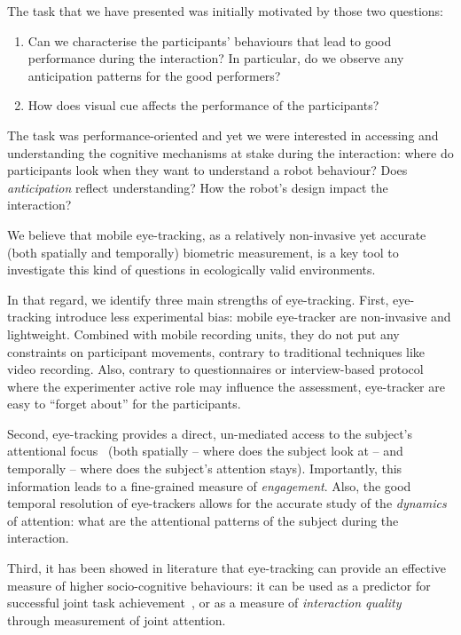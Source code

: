 \documentclass{sig-alternate}
\begin{document}
The task that we have presented was initially motivated by those two questions:

\begin{enumerate}
    \item Can we characterise the participants' behaviours that
        lead to good performance during the interaction? In particular, do
        we observe any anticipation patterns for the good performers?

    \item How does visual cue affects the performance of the participants?

\end{enumerate}

The task was performance-oriented and yet we were interested in accessing and
understanding the cognitive mechanisms at stake during the interaction: where do
participants look when they want to understand a robot behaviour? Does
\emph{anticipation} reflect understanding? How the robot's design impact the
interaction?

We believe that mobile eye-tracking, as a relatively non-invasive yet accurate
(both spatially and temporally) biometric measurement, is a key tool to
investigate this kind of questions in ecologically valid environments.

In that regard, we identify three main strengths of eye-tracking. First,
eye-tracking introduce less experimental bias: mobile eye-tracker are
non-invasive and lightweight. Combined with mobile recording units, they do not
put any constraints on participant movements, contrary to traditional techniques
like video recording. Also, contrary to questionnaires or interview-based
protocol where the experimenter active role may influence the assessment,
eye-tracker are easy to ``forget about'' for the participants.

Second, eye-tracking provides a direct, un-mediated access to the subject's
attentional focus~\cite{sharma2014withmeness} (both spatially -- where does the
subject look at -- and temporally -- where does the subject's attention stays).
Importantly, this information leads to a fine-grained measure of
\emph{engagement}.  Also, the good temporal resolution of eye-trackers allows
for the accurate study of the \emph{dynamics} of attention: what are the
attentional patterns of the subject during the interaction.

Third, it has been showed in literature that eye-tracking can provide an
effective measure of higher socio-cognitive behaviours: it can be used as a
predictor for successful joint task achievement~\cite{sharma2013understanding},
or as a measure of \emph{interaction quality}~\cite{jermann2012effects} through
measurement of joint attention.
\end{document}
